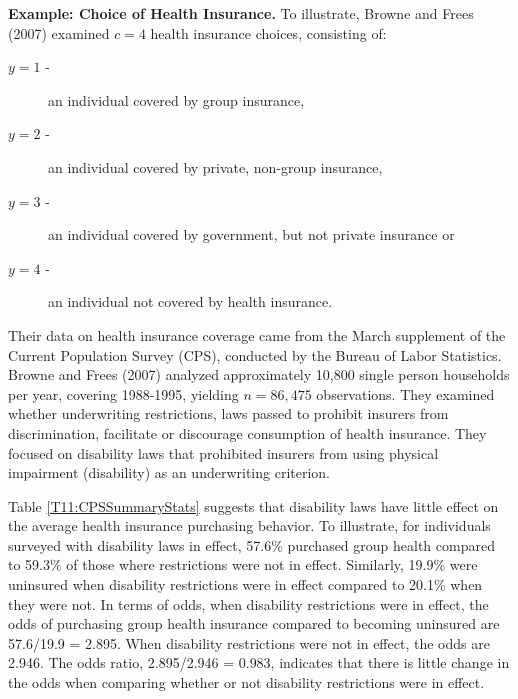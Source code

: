 \textbf{Example: Choice of Health Insurance.} To illustrate, Browne and Frees (2007) examined
$c=4$ health insurance choices, consisting of:
\begin{description}
  \item [$y=1$ -] an individual covered by group insurance,
  \item [$y=2$ -] an individual covered by private, non-group insurance,
  \item [$y=3$ -] an individual covered by government, but not private insurance or
  \item [$y=4$ -] an individual not covered by health insurance.
\end{description}
Their data on health insurance coverage came from the March
supplement of the Current Population Survey (CPS), conducted by the
Bureau of Labor Statistics. Browne and Frees (2007) analyzed
approximately 10,800 single person households per year, covering
1988-1995, yielding $n=86,475$ observations. They examined whether
underwriting restrictions, laws passed to prohibit insurers from
discrimination, facilitate or discourage consumption of health
insurance. They focused on disability laws that prohibited insurers from
using physical impairment (disability) as an underwriting criterion.

Table \ref{T11:CPSSummaryStats} suggests that disability laws have
little effect on the average health insurance purchasing behavior.
To illustrate, for individuals surveyed with disability laws in
effect, 57.6\% purchased group health compared to 59.3\% of those
where restrictions were not in effect. Similarly, 19.9\% were
uninsured when disability restrictions were in effect compared to
20.1\% when they were not. In terms of odds, when disability
restrictions were in effect, the odds of purchasing group health
insurance compared to becoming uninsured are 57.6/19.9 = 2.895. When
disability restrictions were not in effect, the odds are 2.946. The
odds ratio, 2.895/2.946 = 0.983, indicates that there is little
change in the odds when comparing whether or not disability
restrictions were in effect.


